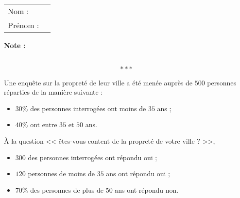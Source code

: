 \documentclass[10pt,french]{article}
\newcommand\competences{
\setcounter{exo}{0}\renewcommand\arraystretch{1.2}
\begin{tabular}{ll} Nom : \\[5pt] Prénom : \end{tabular}
\hfill
\textbf{Note :}
\begin{tabular}{|c|}
\hline
\slashbox{\Huge\bfseries\phantom{10}}{\Huge\bfseries 10}\\
\hline
\end{tabular}\renewcommand\arraystretch{1}
\[***\]
}
\begin{document}
\competences

\exo Une enquête sur la propreté de leur ville a été menée auprès de $500$ personnes réparties de la manière suivante :
\begin{itemize}
    \item $30\%$ des personnes interrogées ont moins de $35$ ans ;
    \item $40\%$ ont entre $35$ et $50$ ans.
\end{itemize}

À la question << êtes-vous content de la propreté de votre ville  ? >>,
    \begin{itemize}
        \item $300$ des personnes interrogées ont répondu oui ; 
        \item $120$ personnes de moins de $35$ ans ont répondu oui ;
        \item $70\%$ des personnes de plus de $50$ ans ont répondu non.
    \end{itemize}
\end{document}
